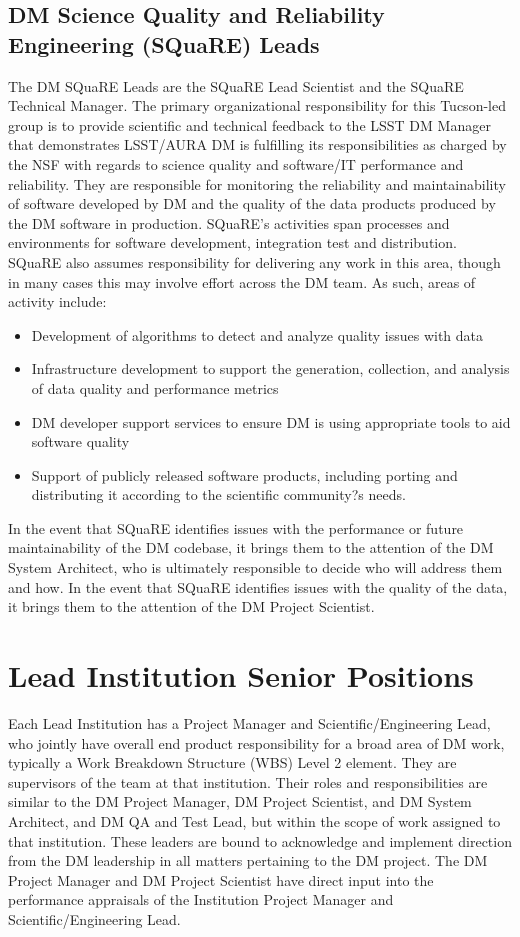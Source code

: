 \subsection{DM Science Quality and Reliability Engineering (SQuaRE) Leads \label{sect:square}}
The DM SQuaRE Leads are the SQuaRE Lead Scientist and the SQuaRE Technical Manager.  The primary organizational responsibility for this Tucson-led group is to provide scientific and technical feedback to the LSST DM Manager that demonstrates LSST/AURA DM is fulfilling its responsibilities as charged by the NSF with regards to science quality and software/IT performance and reliability.
They are responsible for monitoring the reliability and maintainability of software developed by DM and the quality of the data products produced by the DM software in production. SQuaRE's activities span processes and environments for software development, integration test and distribution.  SQuaRE also assumes responsibility for delivering any work in this area, though in many cases this may involve effort across the DM team. 
As such, areas of activity include:
\begin{itemize}
\item Development of algorithms to detect and analyze quality issues with data
\item Infrastructure development to support the generation, collection, and analysis of data quality and performance metrics
\item DM developer support services to ensure DM is using appropriate tools to aid software quality
\item Support of publicly released software products, including porting and distributing it according to the scientific community?s needs.
\end{itemize}

In the event that SQuaRE identifies issues with the performance or future maintainability of the DM codebase, it brings them to the attention of the DM System Architect, who is ultimately responsible to decide who will address them and how. In the event that SQuaRE identifies issues with the quality of the data, it brings them to the attention of the DM Project Scientist. 


\section{Lead Institution Senior Positions}
Each Lead Institution has a Project Manager and Scientific/Engineering Lead, who jointly have overall end product responsibility for a broad area of DM work, typically a Work Breakdown Structure (WBS) Level 2 element. They are supervisors of the team at that institution.  Their roles and responsibilities are similar to the DM Project Manager, DM Project Scientist, and DM System Architect, and DM QA and Test Lead, but within the scope of work assigned to that institution.  These leaders are bound to acknowledge and implement direction from the DM leadership in all matters pertaining to the DM project.  The DM Project Manager and DM Project Scientist have direct input into the performance appraisals of the Institution Project Manager and Scientific/Engineering Lead. 

